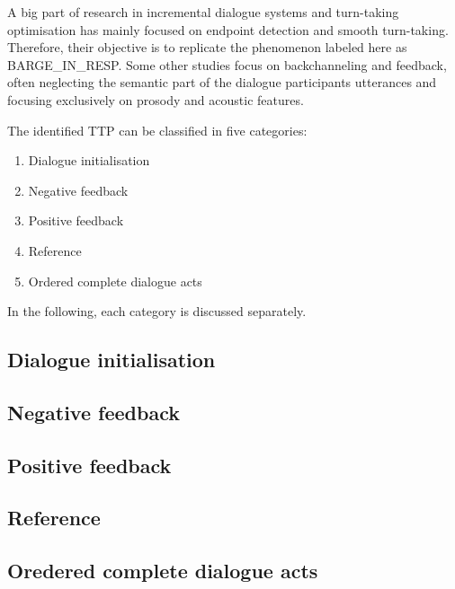     A big part of research in incremental dialogue systems and turn-taking optimisation has mainly focused on endpoint detection \cite{Raux2008} and smooth turn-taking. Therefore, their objective is to replicate the phenomenon labeled here as BARGE\_IN\_RESP. Some other studies focus on backchanneling and feedback, often neglecting the semantic part of the dialogue participants utterances and focusing exclusively on prosody and acoustic features.
    


    The identified TTP can be classified in five categories:
    
    \begin{enumerate}
      \item Dialogue initialisation
      \item Negative feedback
      \item Positive feedback
      \item Reference
      \item Ordered complete dialogue acts
    \end{enumerate}

    In the following, each category is discussed separately.

    \subsection{Dialogue initialisation}

    \subsection{Negative feedback}

    \subsection{Positive feedback}

    \subsection{Reference}

    \subsection{Oredered complete dialogue acts}
